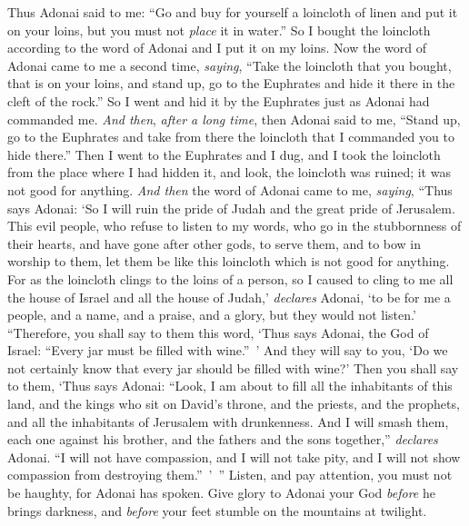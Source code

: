 \begin{biblechapter} %
 Thus Adonai said to me: “Go and buy for yourself a loincloth of linen and put it on your loins, but you must not \textit{place} it in water.”
\verse So I bought the loincloth according to the word of Adonai and I put it on my loins.
\verse Now the word of Adonai came to me a second time, \textit{saying},
\verse “Take the loincloth that you bought, that is on your loins, and stand up, go to the Euphrates and hide it there in the cleft of the rock.”
\verse So I went and hid it by the Euphrates just as Adonai had commanded me.
\verse \textit{And then}, \textit{after a long time}, then Adonai said to me, “Stand up, go to the Euphrates and take from there the loincloth that I commanded you to hide there.”
\verse Then I went to the Euphrates and I dug, and I took the loincloth from the place where I had hidden it, and look, the loincloth was ruined; it was not good for anything.
\verse \textit{And then} the word of Adonai came to me, \textit{saying},
\verse “Thus says Adonai: ‘So I will ruin the pride of Judah and the great pride of Jerusalem.
\verse This evil people, who refuse to listen to my words, who go in the stubbornness of their hearts, and have gone after other gods, to serve them, and to bow in worship to them, let them be like this loincloth which is not good for anything.
\verse For as the loincloth clings to the loins of a person, so I caused to cling to me all the house of Israel and all the house of Judah,’ \textit{declares} Adonai, ‘to be for me a people, and a name, and a praise, and a glory, but they would not listen.’
\verse “Therefore, you shall say to them this word, ‘Thus says Adonai, the God of Israel: “Every jar must be filled with wine.” ’ And they will say to you, ‘Do we not certainly know that every jar should be filled with wine?’
\verse Then you shall say to them, ‘Thus says Adonai: “Look, I am about to fill all the inhabitants of this land, and the kings who sit on David’s throne, and the priests, and the prophets, and all the inhabitants of Jerusalem with drunkenness.
\verse And I will smash them, each one against his brother, and the fathers and the sons together,” \textit{declares} Adonai. “I will not have compassion, and I will not take pity, and I will not show compassion from destroying them.” ’ ”
\verse Listen, and pay attention, 
you must not be haughty, for Adonai has spoken.
\verse Give glory to Adonai your God \textit{before} he brings darkness, 
and \textit{before} your feet stumble on the mountains at twilight. 

\end{biblechapter}

